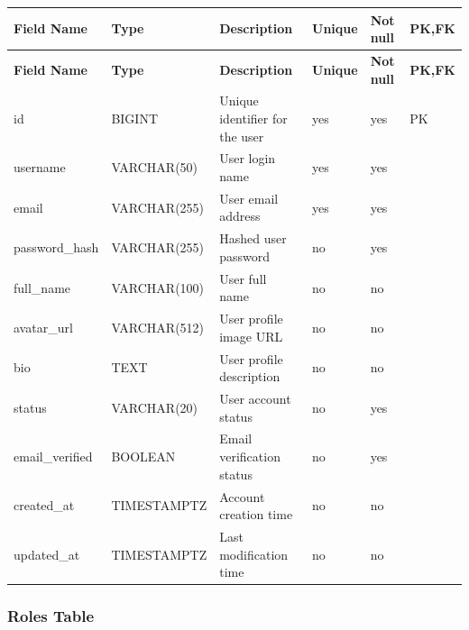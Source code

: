 \vspace{0.5em}
\renewcommand{\arraystretch}{1.15}
\setlength{\tabcolsep}{4pt}
\small
\begin{longtable}{|>{\raggedright\arraybackslash}p{}|>{\raggedright\arraybackslash}p{}|>{\raggedright\arraybackslash}p{}|>{\centering\arraybackslash}p{}|>{\centering\arraybackslash}p{}|>{\centering\arraybackslash}p{}|}
\hline
\textbf{Field Name} & \textbf{Type} & \textbf{Description} & \textbf{Unique} & \textbf{Not null} & \textbf{PK,FK} \\
\hline
\endfirsthead
\textbf{Field Name} & \textbf{Type} & \textbf{Description} & \textbf{Unique} & \textbf{Not null} & \textbf{PK,FK} \\
\hline
\endhead
id & BIGINT & Unique identifier for the user & yes & yes & PK \\
\hline
username & VARCHAR(50) & User login name & yes & yes & \\
\hline
email & VARCHAR(255) & User email address & yes & yes & \\
\hline
password\_hash & VARCHAR(255) & Hashed user password & no & yes & \\
\hline
full\_name & VARCHAR(100) & User full name & no & no & \\
\hline
avatar\_url & VARCHAR(512) & User profile image URL & no & no & \\
\hline
bio & TEXT & User profile description & no & no & \\
\hline
status & VARCHAR(20) & User account status & no & yes & \\
\hline
email\_verified & BOOLEAN & Email verification status & no & yes & \\
\hline
created\_at & TIMESTAMPTZ & Account creation time & no & no & \\
\hline
updated\_at & TIMESTAMPTZ & Last modification time & no & no & \\
\hline
\end{longtable}

\vspace{1em}
\subsubsection{Roles Table}
\label{subsubsec:roles-table}

